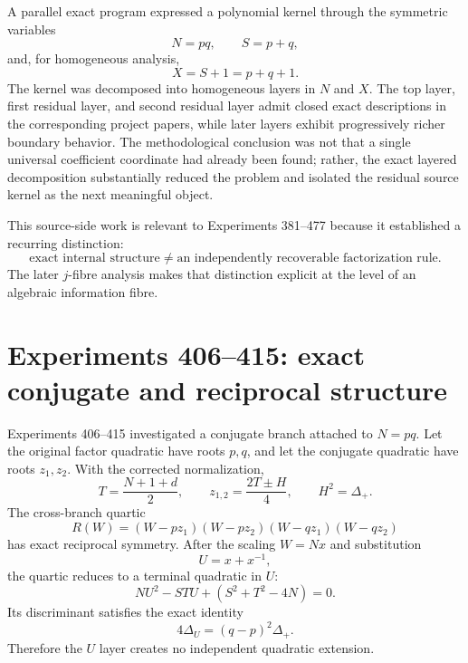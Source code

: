 \documentclass[11pt,a4paper]{article}
\begin{document}
A parallel exact program expressed a polynomial kernel through the symmetric variables
\begin{equation}
N=pq,\qquad S=p+q,
\end{equation}
and, for homogeneous analysis,
\begin{equation}
X=S+1=p+q+1.
\end{equation}
The kernel was decomposed into homogeneous layers in $N$ and $X$. The top layer, first residual layer, and second residual layer admit closed exact descriptions in the corresponding project papers, while later layers exhibit progressively richer boundary behavior. The methodological conclusion was not that a single universal coefficient coordinate had already been found; rather, the exact layered decomposition substantially reduced the problem and isolated the residual source kernel as the next meaningful object.

This source-side work is relevant to Experiments 381--477 because it established a recurring distinction:
\begin{equation}
\text{exact internal structure}\neq\text{an independently recoverable factorization rule}.
\end{equation}
The later $j$-fibre analysis makes that distinction explicit at the level of an algebraic information fibre.

\section{Experiments 406--415: exact conjugate and reciprocal structure}

Experiments 406--415 investigated a conjugate branch attached to $N=pq$. Let the original factor quadratic have roots $p,q$, and let the conjugate quadratic have roots $z_1,z_2$. With the corrected normalization,
\begin{equation}
T=\frac{N+1+d}{2},
\qquad
z_{1,2}=\frac{2T\pm H}{4},
\qquad H^2=\Delta_+.
\end{equation}
The cross-branch quartic
\begin{equation}
R(W)=(W-pz_1)(W-pz_2)(W-qz_1)(W-qz_2)
\end{equation}
has exact reciprocal symmetry. After the scaling $W=Nx$ and substitution
\begin{equation}
U=x+x^{-1},
\end{equation}
the quartic reduces to a terminal quadratic in $U$:
\begin{equation}
NU^2-STU+(S^2+T^2-4N)=0.
\end{equation}
Its discriminant satisfies the exact identity
\begin{equation}
\boxed{4\Delta_U=(q-p)^2\Delta_+.}
\end{equation}
Therefore the $U$ layer creates no independent quadratic extension.
\end{document}
